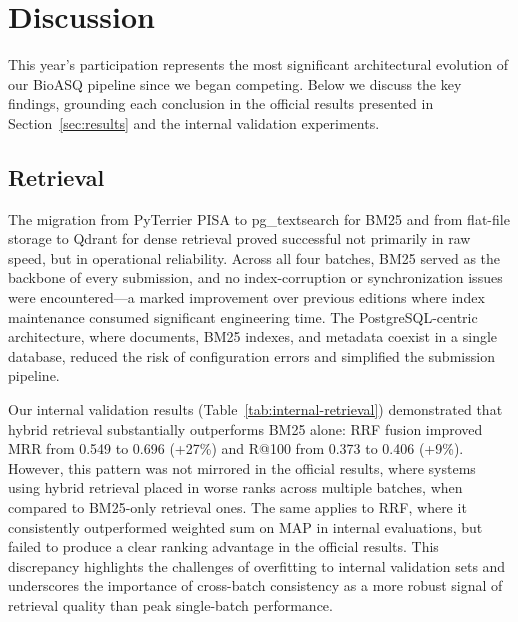 \section{Discussion}
\label{sec:discussion}

This year's participation represents the most significant architectural evolution of our BioASQ pipeline since we began competing. Below we discuss the key findings, grounding each conclusion in the official results presented in Section~\ref{sec:results} and the internal validation experiments.

\subsection{Retrieval}

The migration from PyTerrier PISA to pg\_textsearch for BM25 and from flat-file storage to Qdrant for dense retrieval proved successful not primarily in raw speed, but in operational reliability. Across all four batches, BM25 served as the backbone of every submission, and no index-corruption or synchronization issues were encountered---a marked improvement over previous editions where index maintenance consumed significant engineering time. The PostgreSQL-centric architecture, where documents, BM25 indexes, and metadata coexist in a single database, reduced the risk of configuration errors and simplified the submission pipeline.

Our internal validation results (Table~\ref{tab:internal-retrieval}) demonstrated that hybrid retrieval substantially outperforms BM25 alone: RRF fusion improved MRR from 0.549 to 0.696 (+27\%) and R@100 from 0.373 to 0.406 (+9\%). However, this pattern was not mirrored in the official results, where systems using hybrid retrieval placed in worse ranks across multiple batches, when compared to BM25-only retrieval ones. The same applies to RRF, where it consistently outperformed weighted sum on MAP in internal evaluations, but failed to produce a clear ranking advantage in the official results. This discrepancy highlights the challenges of overfitting to internal validation sets and underscores the importance of cross-batch consistency as a more robust signal of retrieval quality than peak single-batch performance.

